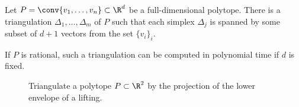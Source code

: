 \begin{theorem}
  \label{thm:polytope-triangulation}
  Let $P = \conv\{ v_1, \ldots, v_n \} \subset \R^d$ be a full-dimensional polytope.
  There is a triangulation $\Delta_1, \ldots, \Delta_m$ of $P$
  such that each simplex $\Delta_j$ is spanned by some subset of $d+1$ vectors from the set $\{ v_i \}_i$.

  If $P$ is rational, such a triangulation can be computed in polynomial time if $d$ is fixed.
\end{theorem}
\begin{figure}
  \begin{center}
  \end{center}
  \caption{Triangulate a polytope $P \subset \R^2$ by the projection of the lower envelope of a lifting.}
  \label{fig:triangulation-proof}
\end{figure}
